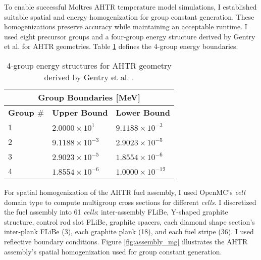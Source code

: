 To enable successful Moltres \gls{AHTR} temperature model simulations, I established 
suitable spatial and energy homogenization for group constant generation.
These homogenizations preserve accuracy while maintaining an acceptable runtime.
I used eight precursor groups and a four-group energy structure derived by Gentry et al. 
\cite{gentry_development_2016} for \gls{AHTR} geometries.
Table \ref{tab:energy_structures-bm} defines the 4-group energy boundaries. 
\begin{table}[htbp]
    \centering
    \onehalfspacing
    \caption{4-group energy structures for \acrfull{AHTR} geometry 
    derived by Gentry et al. \cite{gentry_development_2016}.}
	\label{tab:energy_structures-bm}
    \footnotesize
    \begin{tabular}{lll}
    \hline
    \multicolumn{3}{c}{\textbf{Group Boundaries [MeV]}} \\ 
    \hline
    \textbf{Group $\#$}& \textbf{Upper Bound} & \textbf{Lower Bound}  \\
    \hline 
    1 & $2.0000\times 10^1$ & $9.1188\times 10^{-3}$ \\ 
    2 & $9.1188\times 10^{-3}$ & $2.9023\times 10^{-5}$\\
    3 & $2.9023\times 10^{-5}$ & $1.8554\times 10^{-6}$\\
    4 & $1.8554\times 10^{-6}$ & $1.0000\times 10^{-12}$\\
    \hline
    \end{tabular}
\end{table}
For spatial homogenization of the \gls{AHTR} fuel assembly, I used OpenMC's \textit{cell} 
domain type to compute multigroup cross sections for different \textit{cells}.
I discretized the fuel assembly into 61 \textit{cells}: inter-assembly \gls{FLiBe}, Y-shaped 
graphite structure, control rod slot \gls{FLiBe}, graphite spacers, each diamond shape section's 
inter-plank \gls{FLiBe} (3), each graphite plank (18), and each fuel stripe (36).
I used reflective boundary conditions.
Figure \ref{fig:assembly_mg} illustrates the \gls{AHTR} assembly's spatial 
homogenization used for group constant generation.
